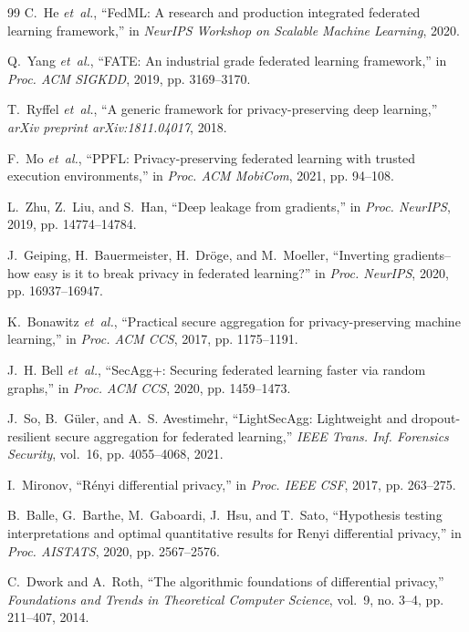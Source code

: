 \documentclass[conference]{IEEEtran}
\begin{document}
\begin{thebibliography}{99}
C.~He \emph{et~al.}, ``FedML: A research and production integrated federated learning framework,'' in \emph{NeurIPS Workshop on Scalable Machine Learning}, 2020.

Q.~Yang \emph{et~al.}, ``FATE: An industrial grade federated learning framework,'' in \emph{Proc. ACM SIGKDD}, 2019, pp. 3169--3170.

T.~Ryffel \emph{et~al.}, ``A generic framework for privacy-preserving deep learning,'' \emph{arXiv preprint arXiv:1811.04017}, 2018.

F.~Mo \emph{et~al.}, ``PPFL: Privacy-preserving federated learning with trusted execution environments,'' in \emph{Proc. ACM MobiCom}, 2021, pp. 94--108.

L.~Zhu, Z.~Liu, and S.~Han, ``Deep leakage from gradients,'' in \emph{Proc. NeurIPS}, 2019, pp. 14774--14784.

J.~Geiping, H.~Bauermeister, H.~Dr{\"o}ge, and M.~Moeller, ``Inverting gradients--how easy is it to break privacy in federated learning?'' in \emph{Proc. NeurIPS}, 2020, pp. 16937--16947.

K.~Bonawitz \emph{et~al.}, ``Practical secure aggregation for privacy-preserving machine learning,'' in \emph{Proc. ACM CCS}, 2017, pp. 1175--1191.

J.~H. Bell \emph{et~al.}, ``SecAgg+: Securing federated learning faster via random graphs,'' in \emph{Proc. ACM CCS}, 2020, pp. 1459--1473.

J.~So, B.~G{\"u}ler, and A.~S. Avestimehr, ``LightSecAgg: Lightweight and dropout-resilient secure aggregation for federated learning,'' \emph{IEEE Trans. Inf. Forensics Security}, vol.~16, pp. 4055--4068, 2021.

I.~Mironov, ``R{\'e}nyi differential privacy,'' in \emph{Proc. IEEE CSF}, 2017, pp. 263--275.

B.~Balle, G.~Barthe, M.~Gaboardi, J.~Hsu, and T.~Sato, ``Hypothesis testing interpretations and optimal quantitative results for Renyi differential privacy,'' in \emph{Proc. AISTATS}, 2020, pp. 2567--2576.

C.~Dwork and A.~Roth, ``The algorithmic foundations of differential privacy,'' \emph{Foundations and Trends in Theoretical Computer Science}, vol.~9, no. 3--4, pp. 211--407, 2014.


\end{thebibliography}
\end{document}
